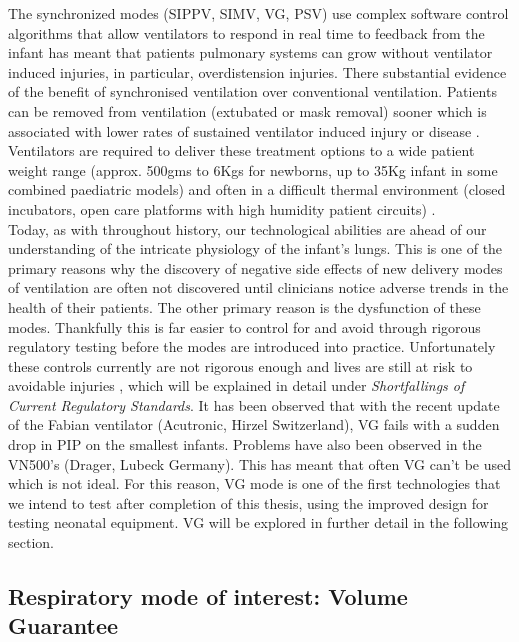 \documentclass[12pt, openany, oneside]{book}
\begin{document}
The synchronized modes (SIPPV, SIMV, VG, PSV) use complex software control algorithms that allow ventilators to respond in real time to feedback from the infant has meant that patients pulmonary systems can grow without ventilator induced injuries, in particular, overdistension injuries. There substantial evidence of the benefit of synchronised ventilation over conventional ventilation. Patients can be removed from ventilation (extubated or mask removal) sooner which is associated with lower rates of sustained ventilator induced injury or disease \cite{evidence, mccallion2008, mccallion2005}. Ventilators are required to deliver these treatment options to a wide patient weight range (approx. 500gms to 6Kgs for newborns, up to 35Kg infant in some combined paediatric models) and often in a difficult thermal environment (closed incubators, open care platforms with high humidity patient circuits) \cite{muzza}.\\


Today, as with throughout history, our technological abilities are ahead of our understanding of the intricate physiology of the infant's lungs. This is one of the primary reasons why the discovery of negative side effects of new delivery modes of ventilation are often not discovered until clinicians notice adverse trends in the health of their patients. The other primary reason is the dysfunction of these modes. Thankfully this is far easier to control for and avoid through rigorous regulatory testing before the modes are introduced into practice. Unfortunately these controls currently are not rigorous enough and lives are still at risk to avoidable injuries \cite{muzza, mark, hinder2016, mccallion2005}, which will be explained in detail under \textit{Shortfallings of Current Regulatory Standards}. It has been observed that with the recent update of the Fabian ventilator (Acutronic, Hirzel Switzerland), VG fails with a sudden drop in PIP on the smallest infants. Problems have also been observed in the VN500's (Drager, Lubeck Germany). This has meant that often VG can't be used which is not ideal. For this reason, VG mode is one of the first technologies that we intend to test after completion of this thesis, using the improved design for testing neonatal equipment. VG will be explored in further detail in the following section.



\subsection{Respiratory mode of interest: Volume Guarantee}
\end{document}
